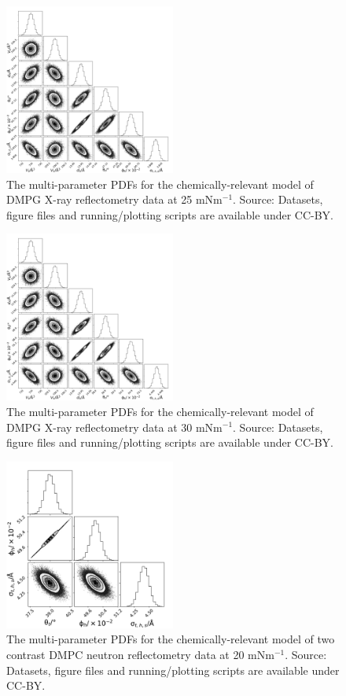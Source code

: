 \documentclass[11pt,a4paper]{paper}
\begin{document}
\begin{figure}[h]
	\centering
	\includegraphics[width=0.50\textwidth]{figures/dmpg3_all_corner}
	\caption{The multi-parameter PDFs for the chemically-relevant model of DMPG X-ray reflectometry data at 25 mNm$^{-1}$. Source: Datasets, figure files and running/plotting scripts are available under CC-BY.\cite{mccluskey_2018}}
	\label{fig:dmpg4}
\end{figure}
\begin{figure}
	\centering
	\includegraphics[width=0.50\textwidth]{figures/dmpg4_all_corner}
	\caption{The multi-parameter PDFs for the chemically-relevant model of DMPG X-ray reflectometry data at 30 mNm$^{-1}$. Source: Datasets, figure files and running/plotting scripts are available under CC-BY.\cite{mccluskey_2018}}
	\label{fig:dmpg5}
\end{figure}
\begin{figure}[h]
	\centering
	\includegraphics[width=0.50\textwidth]{figures/dmpc_20n_all_corner}
	\caption{The multi-parameter PDFs for the chemically-relevant model of two contrast DMPC neutron reflectometry data at 20 mNm$^{-1}$. Source: Datasets, figure files and running/plotting scripts are available under CC-BY.\cite{mccluskey_2018}}
	\label{fig:dmpcn1}
\end{figure}
\end{document}
